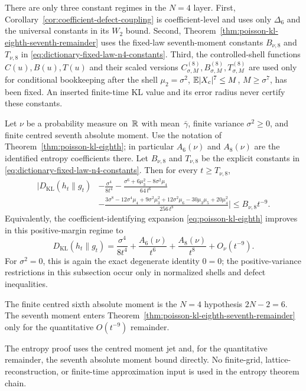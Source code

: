 There are only three constant regimes in the \(N=4\) layer.  First,
Corollary~\ref{cor:coefficient-defect-coupling} is coefficient-level and uses
only \(\Delta_6\) and the universal constants in its \(W_2\) bound.  Second,
Theorem~\ref{thm:poisson-kl-eighth-seventh-remainder} uses the fixed-law
seventh-moment constants \(B_{\nu,8}\) and \(T_{\nu,8}\) in
\eqref{eq:dictionary-fixed-law-n4-constants}.  Third, the controlled-shell
functions \(C(u),B(u),T(u)\) and their scaled versions
\(C_{\sigma,M}^{(8)},B_{\sigma,M}^{(8)},T_{\sigma,M}^{(8)}\) are used only
for conditional bookkeeping after the shell
\(\mu_2=\sigma^2\), \(\mathbb{E}|X_c|^7\le M\), \(M\ge\sigma^7\), has been fixed.
An inserted finite-time KL value and its error radius never certify these
constants.

\begin{theorem}[Quantitative \(N=4\) remainder under the seventh moment]%
\label{thm:poisson-kl-eighth-seventh-remainder}
Let $\nu$ be a probability measure on~$\mathbb{R}$ with mean~$\bar{\gamma}$,
finite variance $\sigma^2\ge0$, and finite centred seventh absolute moment.  Use the
notation of Theorem~\ref{thm:poisson-kl-eighth}; in particular
\(A_6(\nu)\) and \(A_8(\nu)\) are the identified entropy coefficients there.
Let \(B_{\nu,8}\) and \(T_{\nu,8}\) be the explicit constants in
\eqref{eq:dictionary-fixed-law-n4-constants}.  Then for every
\(t\ge T_{\nu,8}\),
\begin{equation}\label{eq:poisson-kl-eighth-remainder}
\begin{split}
\Bigg|D_{\mathrm{KL}}(h_t\|g_t)
&-\frac{\sigma^4}{8t^4}
-\frac{\sigma^6+6\mu_3^2-8\sigma^2\mu_4}{64\,t^6}
\\
&-\frac{3\sigma^8-12\sigma^4\mu_4+9\sigma^2\mu_3^2
+12\sigma^2\mu_6-30\mu_3\mu_5+20\mu_4^2}{256\,t^8}
\Bigg|
\le B_{\nu,8}t^{-9}.
\end{split}
\end{equation}
Equivalently, the coefficient-identifying expansion
\eqref{eq:poisson-kl-eighth} improves in this positive-margin regime to
\[
D_{\mathrm{KL}}(h_t\|g_t)
=\frac{\sigma^4}{8t^4}
+\frac{A_6(\nu)}{t^6}
+\frac{A_8(\nu)}{t^8}
+O_\nu(t^{-9}).
\]
For \(\sigma^2=0\), this is again the exact degenerate identity \(0=0\);
the positive-variance restrictions in this subsection occur only in
normalized shells and defect inequalities.
\end{theorem}

\begin{remark}
The finite centred sixth absolute moment is the \(N=4\) hypothesis
\(2N-2=6\).  The seventh moment enters
Theorem~\ref{thm:poisson-kl-eighth-seventh-remainder} only for the
quantitative \(O(t^{-9})\) remainder.

The entropy proof uses the centred moment jet and, for the quantitative
remainder, the seventh absolute moment bound directly.  No finite-grid,
lattice-reconstruction, or finite-time approximation input is used in the
entropy theorem chain.
\end{remark}

